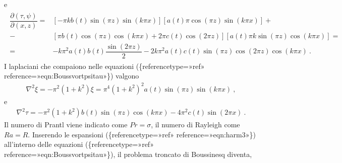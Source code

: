 \documentclass[letterpaper,10pt,italian]{jupyterBook}
\begin{document}
\sphinxAtStartPar
e
\begin{equation*}
\begin{split}\begin{aligned}
    \dfrac{\partial (\tau, \psi)}{\partial (x,z)} = &
    \left[ - \pi k b(t) \sin{(\pi z )} \sin{(k \pi x)} \right]
    \left[ a(t) \pi \cos{(\pi z)} \sin{(k \pi x)} \right] + \\
    - & \left[ \pi b(t) \cos{(\pi z )} \cos{(k \pi x)} + 2\pi c(t) \cos{(2\pi z)} \right]
    \left[ a(t) \pi k \sin{(\pi z)} \cos{(k \pi x)} \right] = \\
    = & - k \pi^2 a(t) b(t) \dfrac{\sin{( 2 \pi z)}}{2} -
    2 k \pi^2 a(t)c(t) \sin(\pi z) \cos(2\pi z) \cos(k \pi x) \ .
\end{aligned}\end{split}
\end{equation*}
\sphinxAtStartPar
I laplaciani che compaiono nelle equazioni
(\{reference\sphinxhyphen{}type=»ref»
reference=»eqn:Bouss\sphinxhyphen{}vort\sphinxhyphen{}psi\sphinxhyphen{}tau»\}) valgono
\begin{equation*}
\begin{split}\nabla^2 \xi = -\pi^2 (1+k^2) \xi = \pi^4 (1+k^2)^2 a(t) \sin{(\pi z)} \sin{(k \pi x)} \ ,\end{split}
\end{equation*}
\sphinxAtStartPar
e
\begin{equation*}
\begin{split}\nabla^2 \tau = -\pi^2 (1+k^2) b(t) \sin{(\pi z)}\cos{(k \pi x)} - 4 \pi^2 c(t) \sin{(2\pi x)} \ .\end{split}
\end{equation*}
\sphinxAtStartPar
Il numero di Prantl viene indicato come \(Pr = \sigma\), il numero di
Rayleigh come \(Ra = R\). Inserendo le espansioni
(\{reference\sphinxhyphen{}type=»ref»
reference=»eqn:harm\sphinxhyphen{}3»\}) all’interno delle equazioni
(\{reference\sphinxhyphen{}type=»ref»
reference=»eqn:Bouss\sphinxhyphen{}vort\sphinxhyphen{}psi\sphinxhyphen{}tau»\}), il problema troncato di Boussinesq
diventa,
\end{document}

